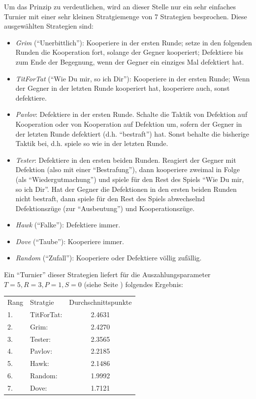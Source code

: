 Um das Prinzip zu verdeutlichen, wird an dieser Stelle nur ein sehr einfaches
Turnier mit einer sehr kleinen Stratgiemenge von 7 Strategien besprochen.
Diese ausgewählten Strategien sind:
\begin{itemize}
  \label{Strategien}
  \item {\em Grim} ("`Unerbittlich"'): Kooperiere in der ersten Runde;
  setze in den folgenden Runden die Kooperation fort, solange der Gegner
  kooperiert; Defektiere bis zum Ende der Begegnung, wenn der Gegner ein
  einziges Mal defektiert hat.
  \item {\em TitForTat} ("`Wie Du mir, so ich Dir"'): Kooperiere in der ersten
  Runde; Wenn der Gegner in der letzten Runde kooperiert hat, kooperiere auch,
  sonst defektiere.
  \item {\em Pavlov}: Defektiere in der ersten Runde. Schalte die Taktik von
  Defektion auf Kooperation oder von Kooperation auf Defektion um, sofern der
  Gegner in der letzten Runde defektiert (d.h. "`bestraft"') hat. Sonst behalte
  die bisherige Taktik bei, d.h. spiele so wie in der letzten Runde.
  \item {\em Tester}: Defektiere in den ersten beiden Runden. Reagiert der
  Gegner mit Defektion (also mit einer "`Bestrafung"'), dann kooperiere zweimal
  in Folge (als "`Wiedergutmachung"') und spiele für den Rest des Spiels "`Wie
  Du mir, so ich Dir"'. Hat der Gegner die Defektionen in den ersten beiden
  Runden nicht bestraft, dann spiele für den Rest des Spiels abwechselnd
  Defektionszüge (zur "`Ausbeutung"') und Kooperationszüge.
  \item {\em Hawk} ("`Falke"'): Defektiere immer.
  \item {\em Dove} ("`Taube"'): Kooperiere immer.
  \item {\em Random} ("`Zufall"'): Kooperiere oder Defektiere völlig zufällig.
\end{itemize}
Ein "`Turnier"' dieser Strategien liefert für die Auszahlungsparameter
$T=5, R=3, P=1, S=0$ (siehe Seite \pageref{GefangenendilemmaTabelle}) folgendes
Ergebnis:
\begin{center}
\begin{tabular}{llc}
Rang & Stratgie & Durchschnittspunkte \\ \cline{1-3}
1. & TitForTat:         &            2.4631 \\
2. & Grim:              &            2.4270 \\
3. & Tester:            &            2.3565 \\
4. & Pavlov:            &            2.2185 \\
5. & Hawk:              &            2.1486 \\
6. & Random:            &            1.9992 \\
7. & Dove:              &            1.7121 \\
\end{tabular}
\end{center}
